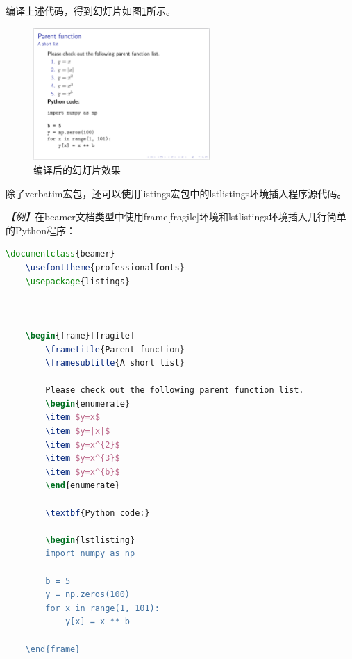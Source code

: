 编译上述代码，得到幻灯片如图\ref{fig:937}所示。

\begin{figure}[htbp]
    \centering
    \includegraphics[width = 0.6\textwidth]{images/ch_9/example15.png}
    \caption{编译后的幻灯片效果}
    \label{fig:937}
\end{figure}

除了verbatim宏包，还可以使用listings宏包中的lstlistings环境插入程序源代码。

\emph{【例】}在beamer文档类型中使用frame[fragile]环境和lstlistings环境插入几行简单的Python程序：
\begin{lstlisting}[language=TeX]
    \documentclass{beamer}
    \usefonttheme{professionalfonts}
    \usepackage{listings}

    

    \begin{frame}[fragile]
        \frametitle{Parent function}
        \framesubtitle{A short list}

        Please check out the following parent function list.
        \begin{enumerate}
        \item $y=x$
        \item $y=|x|$
        \item $y=x^{2}$
        \item $y=x^{3}$
        \item $y=x^{b}$
        \end{enumerate}

        \textbf{Python code:}

        \begin{lstlisting}
        import numpy as np

        b = 5
        y = np.zeros(100)
        for x in range(1, 101):
            y[x] = x ** b

    \end{frame}

    
\end{lstlisting}

